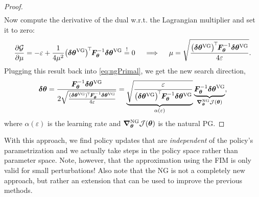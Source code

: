 \begin{proof}
\begin{align}
			\end{align}
			Now compute the derivative of the dual w.r.t. the Lagrangian multiplier and set it to zero:
			\begin{equation}
				\pdv{\mathcal{G}}{\mu} = -\varepsilon + \frac{1}{4 \mu^2} \bigl(\bm{\delta\theta}^\mathrm{VG}\bigr)^{\!\top\!} \bm{F}_{\bm{\theta}}^{-1} \bm{\delta\theta}^\mathrm{VG} \overset{!}{=} 0
				\quad\implies\quad
				\mu = \sqrt{\frac{\bigl(\bm{\delta\theta}^\mathrm{VG}\bigr)^{\!\top\!} \bm{F}_{\bm{\theta}}^{-1} \bm{\delta\theta}^\mathrm{VG}}{4 \varepsilon}}.
			\end{equation}
			Plugging this result back into \eqref{eq:ngPrimal}, we get the new search direction,
			\begin{equation}
				\bm{\delta\theta}
				= \frac{\bm{F}_{\bm{\theta}}^{-1} \bm{\delta\theta}^\mathrm{VG}}{2 \sqrt{\frac{(\bm{\delta\theta}^\mathrm{VG})^{\!\top\!} \bm{F}_{\bm{\theta}}^{-1} \bm{\delta\theta}^\mathrm{VG}}{4 \varepsilon}}}
				= \underbrace{\sqrt{\frac{\varepsilon}{\bigl(\bm{\delta\theta}^\mathrm{VG}\bigr)^{\!\top\!} \bm{F}_{\bm{\theta}}^{-1} \bm{\delta\theta}^\mathrm{VG}}}}_{\alpha(\varepsilon)} \underbrace{\bm{F}_{\bm{\theta}}^{-1} \bm{\delta\theta}^\mathrm{VG}}_{\grad_{\bm{\theta}}^\mathrm{NG} \mathcal{J}(\bm{\theta})},
			\end{equation}
			where \(\alpha(\varepsilon)\) is the learning rate and \( \grad_{\bm{\theta}}^\mathrm{NG} \mathcal{J}(\bm{\theta}) \) is the natural \ac{PG}.
		\end{proof}
		With this approach, we find policy updates that are \emph{independent} of the policy's parametrization and we actually take steps in the policy space rather than parameter space. Note, however, that the approximation using the \ac{FIM} is only valid for small perturbations! Also note that the \ac{NG} is not a completely new approach, but rather an extension that can be used to improve the previous methods.

